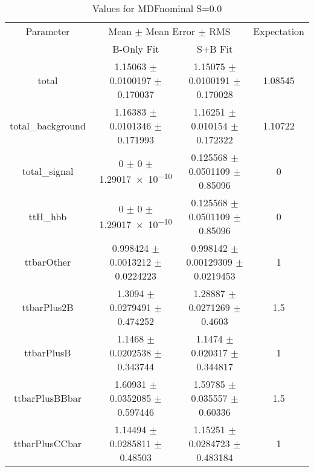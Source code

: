 \begin{table}
\centering
\caption{Values for MDFnominal S=0.0}
\begin{tabular}{cccc}
\toprule
Parameter & \multicolumn{2}{c}{Mean $\pm$ Mean Error $\pm$ RMS} & Expectation\\
 & B-Only Fit & S+B Fit & \\
\midrule
total & \num{1.15063} $\pm$ \num{0.0100197} $\pm$ \num{0.170037} & \num{1.15075} $\pm$ \num{0.0100191} $\pm$ \num{0.170028} & \num{1.08545}\\
total\_background & \num{1.16383} $\pm$ \num{0.0101346} $\pm$ \num{0.171993} & \num{1.16251} $\pm$ \num{0.010154} $\pm$ \num{0.172322} & \num{1.10722}\\
total\_signal & \num{0} $\pm$ \num{0} $\pm$ \num{1.29017e-10} & \num{0.125568} $\pm$ \num{0.0501109} $\pm$ \num{0.85096} & \num{0}\\
ttH\_hbb & \num{0} $\pm$ \num{0} $\pm$ \num{1.29017e-10} & \num{0.125568} $\pm$ \num{0.0501109} $\pm$ \num{0.85096} & \num{0}\\
ttbarOther & \num{0.998424} $\pm$ \num{0.0013212} $\pm$ \num{0.0224223} & \num{0.998142} $\pm$ \num{0.00129309} $\pm$ \num{0.0219453} & \num{1}\\
ttbarPlus2B & \num{1.3094} $\pm$ \num{0.0279491} $\pm$ \num{0.474252} & \num{1.28887} $\pm$ \num{0.0271269} $\pm$ \num{0.4603} & \num{1.5}\\
ttbarPlusB & \num{1.1468} $\pm$ \num{0.0202538} $\pm$ \num{0.343744} & \num{1.1474} $\pm$ \num{0.020317} $\pm$ \num{0.344817} & \num{1}\\
ttbarPlusBBbar & \num{1.60931} $\pm$ \num{0.0352085} $\pm$ \num{0.597446} & \num{1.59785} $\pm$ \num{0.035557} $\pm$ \num{0.60336} & \num{1.5}\\
ttbarPlusCCbar & \num{1.14494} $\pm$ \num{0.0285811} $\pm$ \num{0.48503} & \num{1.15251} $\pm$ \num{0.0284723} $\pm$ \num{0.483184} & \num{1}\\
\bottomrule
\end{tabular}
\end{table}